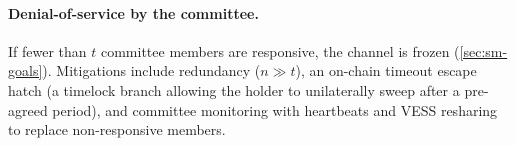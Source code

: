 \paragraph{Denial-of-service by the committee.}
If fewer than $t$ committee members are responsive, the channel is frozen (\autoref{sec:sm-goals}).
Mitigations include redundancy ($n \gg t$),
an on-chain timeout escape hatch (a timelock branch allowing the holder to unilaterally sweep after a pre-agreed period),
and committee monitoring with heartbeats and VESS resharing to replace non-responsive members.
